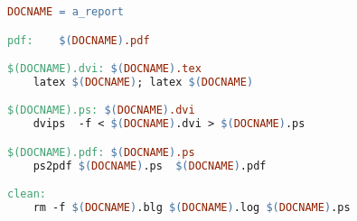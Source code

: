 \begin{lstlisting}[language=make]
DOCNAME = a_report

pdf:	$(DOCNAME).pdf

$(DOCNAME).dvi: $(DOCNAME).tex
	latex $(DOCNAME); latex $(DOCNAME)

$(DOCNAME).ps: $(DOCNAME).dvi
	dvips  -f < $(DOCNAME).dvi > $(DOCNAME).ps

$(DOCNAME).pdf: $(DOCNAME).ps
	ps2pdf $(DOCNAME).ps  $(DOCNAME).pdf

clean:
	rm -f $(DOCNAME).blg $(DOCNAME).log $(DOCNAME).ps
\end{lstlisting}



